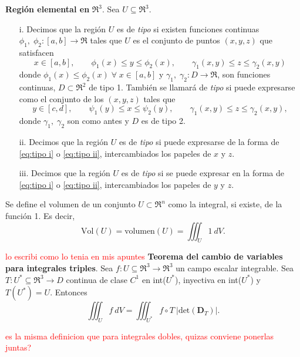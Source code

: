 \begin{definition}
    \textbf{Regi\'on elemental en }$\Re^3$.
    Sea $U\subseteq\Re^3$.
    \begin{enumerate}
        \item[i.]
        Decimos que la regi\'on $U$ es de \textit{tipo}  si existen funciones continuas $\phi_1,\;\phi_2:[a,b]\to\Re$ tales que $U$ es el conjunto de puntos $(x,y,z)$ que satisfacen
        \begin{equation} \label{eq:tipo i}
            x\in[a,b], \qquad \phi_1(x)\leq y\leq\phi_2(x), \qquad \gamma_1(x,y)\leq z\leq\gamma_2(x,y) 
        \end{equation}
        donde $\phi_1(x)\leq\phi_2(x)\;\forall\;x\in[a,b]$ y $\gamma_1,\;\gamma_2:D\to\Re$, son funciones continuas, $D\subset\Re^2$ de tipo 1. Tambi\'en se llamar\'a de \textit{tipo}  si puede expresarse como el conjunto de los $(x,y,z)$ tales que
        \begin{equation} \label{eq:tipo ii}
            y\in[c,d], \qquad \psi_1(y)\leq x\leq\psi_2(y), \qquad \gamma_1(x,y)\leq z\leq\gamma_2(x,y), 
        \end{equation}
        donde $\gamma_1,\;\gamma_2$ son como antes y $D$ es de tipo 2.
        \item[ii.]
        Decimos que la regi\'on $U$ es de \textit{tipo}  si puede expresarse de la forma de \eqref{eq:tipo i} o \eqref{eq:tipo ii}, intercambiados los papeles de $x$ y $z$.
        \item[iii.]
        Decimos que la regi\'on $U$ es de \textit{tipo}  si se puede expresar en la forma de \eqref{eq:tipo i} o \eqref{eq:tipo ii}, intercambiados los papeles de $y$ y $z$.
        \end{enumerate}
\end{definition}

\begin{definition}
    Se define el volumen de un conjunto $U\subset\Re^n$ como la integral, si existe, de la funci\'on 1. Es decir,
    \[
        \text{Vol}(U)=\text{volumen}(U)=\iiint_U1\:dV.  
    \]
\end{definition}

\begin{theorem} \textcolor{red}{lo escribi como lo tenia en mis apuntes}
    \textbf{Teorema del cambio de variables para integrales triples}. Sea $f:U\subseteq\Re^3\to\Re^3$ un campo escalar integrable. Sea $T:U^*\subseteq\Re^3\to D$ continua de clase $C^1$ en int($U^*$), inyectiva en int($U^*$) y $T(U^*)=U$. Entonces
    \[
        \iiint_U f\:dV=\iiint_{U^*}f\circ T\:|\text{det}(\boldsymbol{D}_T)|.
    \]
\end{theorem}
\textcolor{red}{es la misma definicion que para integrales dobles, quizas conviene ponerlas juntas?}
